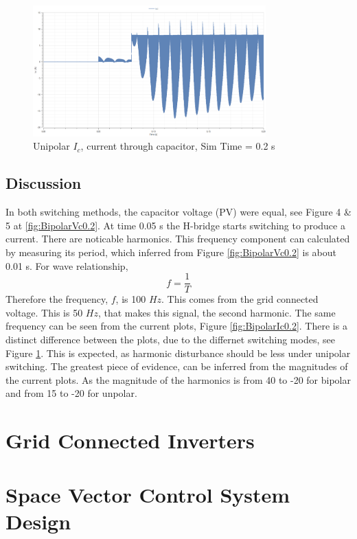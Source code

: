 \documentclass[12pt,twoside]{scrartcl}
\begin{document}
\begin{figure}[htp]
    \centering
    \includegraphics[width=0.8\textwidth]{Unipolar_Ic_0.2.png}
    \caption{Unipolar $I_c$, current through capacitor, Sim Time = 0.2 s}
    \label{fig:UnipolarIc0.2}
\end{figure}
\subsection{Discussion}
In both switching methods, the capacitor voltage (PV) were equal, see Figure 4 \& 5 at \ref{fig:BipolarVc0.2}. 
At time 0.05 s the H-bridge starts switching to produce a current. There are noticable harmonics. This frequency component can 
calculated by measuring its period, which inferred from Figure \ref{fig:BipolarVc0.2} is about 0.01 s. For wave relationship,
\begin{equation}
    f = \dfrac{1}{T}
\end{equation}
Therefore the frequency, $f$, is 100 $Hz$. This comes 
from the grid connected voltage. This is 50 $Hz$,
that makes this signal, the second harmonic. The same frequency can 
be seen from the current plots, Figure \ref{fig:BipolarIc0.2}.
There is a distinct difference between the plots, due to the differnet switching modes, 
see Figure \ref{fig:UnipolarIc0.2}. This is expected, as 
harmonic disturbance should be less under unipolar switching. The greatest piece of 
evidence, can be inferred from the magnitudes of the current plots. 
As the magnitude of the harmonics is from 40 to -20
for bipolar and from 15 to -20 for unpolar. 


\section{Grid Connected Inverters}
\section{Space Vector Control System Design}



\newpage


\end{document}
